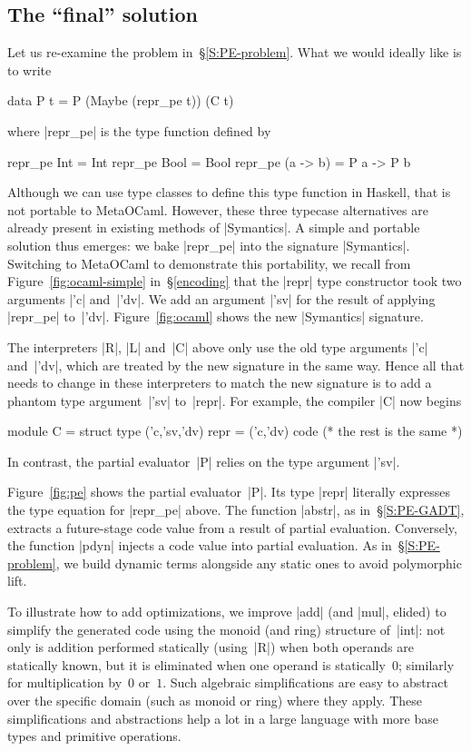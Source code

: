 \documentclass[preprint]{sigplanconf}
\begin{document}
\subsection{The ``final'' solution}
\label{S:PE-solution}
Let us re-examine the problem in~\S\ref{S:PE-problem}. What we
would ideally like is to write
\begin{code}
data P t = P (Maybe (repr_pe t)) (C t)
\end{code}
where |repr_pe| is the type function defined
by
\begin{code}
repr_pe Int      = Int
repr_pe Bool     = Bool
repr_pe (a -> b) = P a -> P b
\end{code}
Although we can use type classes to define this type function
in Haskell, that is not portable to MetaOCaml. However,
these three typecase alternatives are already present in existing
methods of |Symantics|.
A simple and portable solution thus emerges: we bake |repr_pe| 
into the signature |Symantics|. Switching to MetaOCaml to demonstrate this
portability, we recall from Figure~\ref{fig:ocaml-simple} in~\S\ref{encoding} that the |repr| type
constructor took two arguments |'c| and~|'dv|. We add an argument
|'sv| for the result of applying |repr_pe| to~|'dv|.
Figure~\ref{fig:ocaml} shows the new |Symantics| signature.

The interpreters |R|, |L| and~|C| above only use the old
type arguments |'c| and~|'dv|, which are treated by the new signature
in the same way.  Hence all that needs to change in these interpreters
to match the new signature is to add a phantom type
argument~|'sv| to~|repr|.
For example, the compiler |C| now begins
\begin{code}
module C = struct
  type ('c,'sv,'dv) repr = ('c,'dv) code
  (* the rest is the same *)
\end{code}
In contrast, the partial evaluator~|P| relies on the type argument |'sv|.

Figure~\ref{fig:pe} shows the partial evaluator~|P|.
Its type |repr| literally expresses the type equation for |repr_pe| above.
The function |abstr|, as in~\S\ref{S:PE-GADT},
extracts a future-stage code value from a result of
partial evaluation.  Conversely, the function |pdyn| injects a
code value into partial evaluation. As
in~\S\ref{S:PE-problem}, we build dynamic terms alongside
any static ones to avoid polymorphic lift.

To illustrate how to add optimizations, we improve |add| (and |mul|,
elided) to simplify the generated code using the monoid (and ring)
structure of~|int|: not only is addition performed statically
(using~|R|) when both operands are statically known, but it is
eliminated when one operand is statically~$0$; similarly for
multiplication by~$0$ or~$1$.  Such algebraic simplifications are easy
to abstract over the specific domain (such as monoid or ring) where they
apply.  These simplifications and abstractions help a lot in a large
language with more base types and primitive operations.
\end{document}
